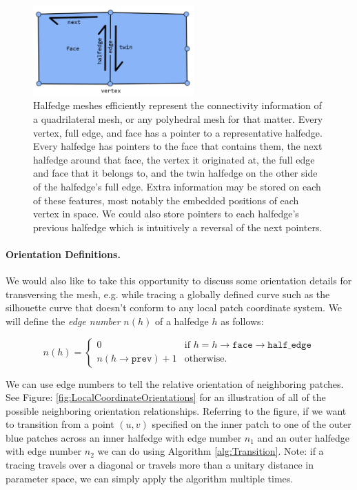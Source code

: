 \documentclass[12pt, letterpaper]{article}
\begin{document}
		\begin{figure}[h]
		\centering
		\includegraphics[width=0.55\textwidth]{HalfedgeMeshFigure_Quadrilateral}
		\caption{Halfedge meshes efficiently represent the connectivity information of a quadrilateral mesh, or any polyhedral mesh for that matter.
				Every vertex, full edge, and face has a pointer to a representative halfedge. Every halfedge has pointers to the face that contains them,
				the next halfedge around that face, the vertex it originated at, the full edge and face that it belongs to, and the twin halfedge on the other
				side of the halfedge's full edge. Extra information may be stored on each of these features, most notably the embedded  positions of each vertex in space.
				We could also store pointers to each halfedge's previous halfedge which is intuitively a reversal of the next pointers.}
		\label{fig:QuadrilateralHalfEdgeMesh}
		\end{figure}

		\paragraph{Orientation Definitions.}
		We would also like to take this opportunity to discuss some orientation details for transversing the mesh, e.g. while
		tracing a globally defined curve such as the silhouette curve that doesn't conform to any local patch coordinate system.
		We will define the \emph{edge number} $n(h)$ of a halfedge $h$ as follows:
		
		$$n(h) =
		\begin{cases}
		0 & \text{if $h = h \rightarrow \texttt{face} \rightarrow \texttt{half\_edge}$}\\
		n(h \rightarrow \texttt{prev}) + 1 & \text{otherwise.}
		\end{cases}$$

		We can use edge numbers to tell the relative orientation of neighboring patches. See Figure: \ref{fig:LocalCoordinateOrientations} for an illustration
		of all of the possible neighboring orientation relationships. Referring to the figure, if we want to transition from a point $(u, v)$ specified on the inner patch
		to one of the outer blue patches across an inner halfedge with edge number $n_{1}$ and an outer halfedge with edge number $n_{2}$
		we can do using Algorithm \ref{alg:Transition}. Note: if a tracing travels over a diagonal or travels more than a unitary distance in parameter space,
		we can simply apply the algorithm multiple times.
\end{document}
